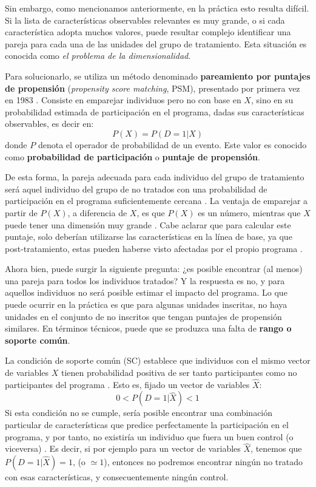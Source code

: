 \documentclass[../../main.tex]{subfiles}
\begin{document}
Sin embargo, como mencionamos anteriormente, en la práctica esto resulta difícil. Si la
lista de características observables relevantes es muy grande, o si cada característica
adopta muchos valores, puede resultar complejo identificar una pareja para cada una de las
unidades del grupo de tratamiento. Esta situación es conocida como \textit{el problema de
la dimensionalidad}.

Para solucionarlo, se utiliza un método denominado \textbf{pareamiento por puntajes de
propensión} (\textit{propensity score matching}, PSM), presentado por primera vez en 1983
\cite{psm1983}. Consiste en emparejar individuos pero no con base en \(X\), sino en su
probabilidad estimada de participación en el programa, dadas sus características
observables, es decir en:
\[P(X) = P(D = 1|X)\] donde \(P\) denota el operador de probabilidad de un evento. Este
valor es conocido como \textbf{probabilidad de participación} o \textbf{puntaje de
propensión}.

De esta forma, la pareja adecuada para cada individuo del grupo de tratamiento será aquel
individuo del grupo de no tratados con una probabilidad de participación en el programa
suficientemente cercana \cite{bernal}. La ventaja de emparejar a partir de \(P(X)\), a
diferencia de \(X\), es que \(P(X)\) es un número, mientras que \(X\) puede tener una
dimensión muy grande \cite{bernal}. Cabe aclarar que para calcular este puntaje, solo
deberían utilizarse las características en la línea de base, ya que post-tratamiento,
estas pueden haberse visto afectadas por el propio programa \cite{gertler-2016}.

Ahora bien, puede surgir la siguiente pregunta: ¿es posible encontrar (al menos) una pareja
para todos los individuos tratados? Y la respuesta es no, y para aquellos individuos no
será posible estimar el impacto del programa. Lo que puede ocurrir en la práctica es que
para algunas unidades inscritas, no haya unidades en el conjunto de no inscritos que
tengan puntajes de propensión similares. En términos técnicos, puede que se produzca una
falta de \textbf{rango o soporte común}.

La condición de soporte común (SC) establece que individuos con el mismo vector de
variables \(X\) tienen probabilidad positiva de ser tanto participantes como no
participantes del programa \cite{bernal}. Esto es, fijado un vector de variables
\(\hat{X}\):
\[0 < P(D=1|\hat{X}) < 1\] Si esta condición no se cumple, sería posible encontrar una
combinación particular de características que predice perfectamente la participación en el
programa, y por tanto, no existiría un individuo que fuera un buen control (o viceversa)
\cite{bernal}. Es decir, si por ejemplo para un vector de variables \(\hat{X}\), tenemos
que \(P(D=1|\hat{X})=1\), (o \(\simeq 1\)), entonces no podremos encontrar ningún no
tratado con esas características, y consecuentemente ningún control.
\end{document}
